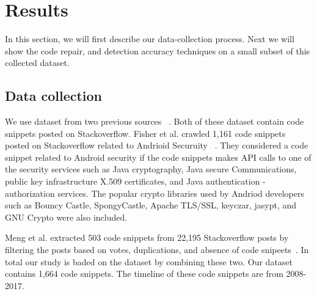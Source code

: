 \section{Results}
\label{sec:results}
In this section, we will first describe our data-collection process. Next we will show the code repair, and detection accuracy techniques on a small subset of this collected dataset.   

\subsection{Data collection} 
  We use dataset from two previous sources ~\cite{meng2018secure,fischer2017stack}. Both of these dataset contain code snippets posted on Stackoverflow. 
  Fisher et al. crawled 1,161 code snippets posted on Stackoverflow related to Andrioid Securuity ~\cite{fischer2017stack}. They considered a code snippet related to Android security if the code snippets makes API calls to
  one of the security services such as Java cryptography, Java secure Communications, public key infrastructure X.509 certificates, and Java authentication - authorization services. The popular crypto libraries used by Andriod developers such as Bouncy Castle, SpongyCastle, Apache TLS/SSL, keyczar, jasypt, and GNU Crypto were also included. 
  
  Meng et al.  extracted 503 code snippets from 22,195 Stackoverflow posts by filtering the posts based on votes, duplications, and absence of code snipeets~\cite{meng2018secure}. In total our study is baded on the dataset by combining these two. Our dataset contains 1,664 code snippets. The timeline of these code snippets are from 2008-2017.


  

